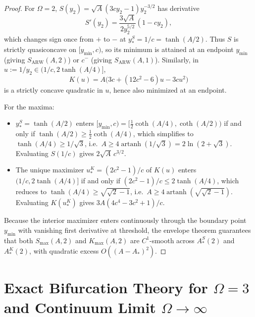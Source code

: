 \documentclass[11pt]{article}
\theoremstyle{definition}
\theoremstyle{remark}
\DeclareMathOperator{\artanh}{artanh}
\begin{document}
\begin{proof}
For $\Omega = 2$, $S(y_2) = \sqrt{A}(3c y_2 - 1)y_2^{-3/2}$ has derivative
\[
  S'(y_2) = \frac{3\sqrt{A}}{2 y_2^{5/2}}(1 - c y_2),
\]
which changes sign once from $+$ to $-$ at $y_*^S = 1/c = \tanh(A/2)$. Thus $S$ is strictly quasiconcave on $[y_{\min}, c)$, so its minimum is attained at an endpoint $y_{\min}$ (giving $S_{\mathrm{ARW}}(A,2)$) or $c^-$ (giving $S_{\mathrm{ARW}}(A,1)$). Similarly, in $u := 1/y_2 \in (1/c, 2\tanh(A/4)]$,
\[
  K(u) = A\bigl(3c + (12c^2 - 6)u - 3c u^2\bigr)
\]
is a strictly concave quadratic in $u$, hence also minimized at an endpoint.

For the maxima:
\begin{itemize}[leftmargin=1.5em,itemsep=2pt]
  \item $y_*^S = \tanh(A/2)$ enters $[y_{\min}, c) = [\frac{1}{2}\coth(A/4), \coth(A/2))$ if and only if $\tanh(A/2) \ge \frac{1}{2}\coth(A/4)$, which simplifies to $\tanh(A/4) \ge 1/\sqrt{3}$, i.e.\ $A \ge 4\artanh(1/\sqrt{3}) = 2\ln(2+\sqrt{3})$. Evaluating $S(1/c)$ gives $2\sqrt{A}\,c^{3/2}$.
  \item The unique maximizer $u_*^K = (2c^2 - 1)/c$ of $K(u)$ enters $(1/c, 2\tanh(A/4)]$ if and only if $(2c^2-1)/c \le 2\tanh(A/4)$, which reduces to $\tanh(A/4) \ge \sqrt{\sqrt{2}-1}$, i.e.\ $A \ge 4\artanh(\sqrt{\sqrt{2}-1})$. Evaluating $K(u_*^K)$ gives $3A(4c^4 - 3c^2 + 1)/c$.
\end{itemize}
Because the interior maximizer enters continuously through the boundary point $y_{\min}$ with vanishing first derivative at threshold, the envelope theorem guarantees that both $S_{\max}(A,2)$ and $K_{\max}(A,2)$ are $C^1$-smooth across $A_*^S(2)$ and $A_*^K(2)$, with quadratic excess $O((A - A_*)^2)$.
\end{proof}

\section{Exact Bifurcation Theory for \texorpdfstring{$\Omega = 3$}{Omega = 3} and Continuum Limit \texorpdfstring{$\Omega \to \infty$}{Omega -> infty}}
\end{document}
